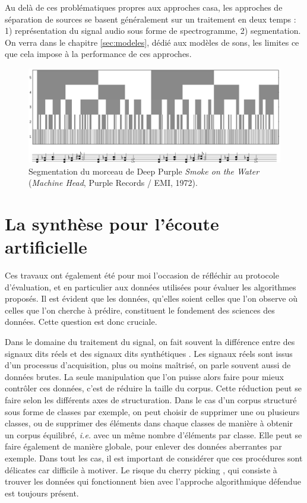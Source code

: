   Au delà de ces problématiques propres aux approches casa, les approches de séparation de sources se basent généralement sur un traitement en deux temps : 1) représentation du signal audio sous forme de spectrogramme, 2) segmentation. On verra dans le chapitre \ref{sec:modeles}, dédié aux modèles de sons, les limites ce que cela impose à la performance de ces approches.


    \begin{figure}[t]
            \includegraphics[width=\textwidth]{figures/smokeCrop}
           \caption{Segmentation du morceau de Deep Purple \emph{Smoke on the Water} (\emph{Machine Head}, Purple Records / EMI, 1972).}  \label{fig:smoke}
\end{figure}


  \section{ \nmu La  synthèse pour l'écoute artificielle} \label{sec:dcase}

  Ces travaux ont également été pour moi l'occasion de réfléchir au protocole d'évaluation, et en particulier aux données utilisées pour évaluer les algorithmes proposés. Il est évident que les données, qu'elles soient celles que l'on observe où celles que l'on cherche à prédire, constituent le fondement des sciences des données. Cette question est donc cruciale.

  Dans le domaine du traitement du signal, on fait souvent la différence entre des signaux dits \og réels \fg et des signaux dits \og synthétiques \fg. Les signaux réels sont issus d'un processus d'acquisition, plus ou moins maîtrisé, on parle souvent aussi de données brutes. La seule manipulation que l'on puisse alors faire pour mieux contrôler ces données, c'est de réduire la taille du corpus. Cette réduction peut se faire selon les différents axes de structuration. Dans le cas d'un corpus structuré sous forme de classes par exemple, on peut choisir de supprimer une ou plusieurs classes, ou de supprimer des éléments dans chaque classes de manière à obtenir un corpus équilibré, \textit{i.e.} avec un même nombre d'éléments par classe. Elle peut se faire également de manière globale, pour enlever des données aberrantes par exemple. Dans tout les cas, il est important de considérer que ces procédures sont délicates car difficile à motiver. Le risque du \og cherry picking \fg, qui consiste à trouver les données qui fonctionnent bien avec l'approche algorithmique défendue est toujours présent.

